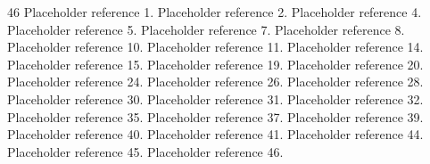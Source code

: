 \documentclass{article}
\begin{document}
\begin{thebibliography}{46}
   Placeholder reference 1.
   Placeholder reference 2.
   Placeholder reference 4.
   Placeholder reference 5.
   Placeholder reference 7.
   Placeholder reference 8.
   Placeholder reference 10.
   Placeholder reference 11.
   Placeholder reference 14.
   Placeholder reference 15.
   Placeholder reference 19.
   Placeholder reference 20.
   Placeholder reference 24.
   Placeholder reference 26.
   Placeholder reference 28.
   Placeholder reference 30.
   Placeholder reference 31.
   Placeholder reference 32.
   Placeholder reference 35.
   Placeholder reference 37.
   Placeholder reference 39.
   Placeholder reference 40.
   Placeholder reference 41.
   Placeholder reference 44.
   Placeholder reference 45.
   Placeholder reference 46.
\end{thebibliography}

\end{document}
